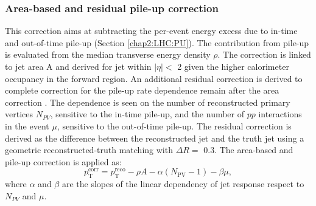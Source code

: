 \subsubsection{Area-based and residual pile-up correction}
\label{Jet:Cal:chain:AreaPU}
This correction aims at subtracting the per-event energy excess due to in-time and out-of-time pile-up (Section \ref{chap2:LHC:PU}). The contribution from pile-up is evaluated from the median transverse energy density $\rho$. The correction is linked to jet area A and derived for jet within $|\eta|<$ 2 given the higher calorimeter occupancy in the forward region. An additional residual correction is derived to complete correction for the pile-up rate dependence remain after the area correction \cite{PileUp_Sub}. The dependence is seen on the number of reconstructed primary vertices $N_{PV}$, sensitive to the in-time pile-up, and the number of $pp$ interactions in the event $\mu$, sensitive to the out-of-time pile-up. The residual correction is derived as the difference between the reconstructed jet \pT and the truth jet \pT using a geometric reconstructed-truth matching with $\Delta R= $ 0.3. The area-based and pile-up correction is applied as:
\begin{equation}
    p_{\mathrm{T}}^{\mathrm{corr}}=p_{\mathrm{T}}^{\mathrm{reco}}-\rho A-\alpha\left(N_{\mathrm{PV}}-1\right)-\beta \mu,
\end{equation}
where $\alpha$ and $\beta$ are the slopes of the linear dependency of jet response respect to $N_{PV}$ and $\mu$.

